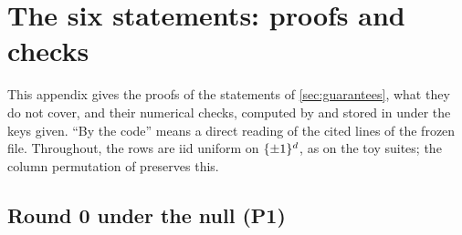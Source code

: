 \clearpage
\section{The six statements: proofs and checks}\label{app:proofs}

This appendix gives the proofs of the statements of \cref{sec:guarantees}, what they do not cover, and their numerical checks, computed by  and stored in  under the keys given. ``By the code'' means a direct reading of the cited lines of the frozen file. Throughout, the rows are iid uniform on $\{\pm1\}^d$, as on the toy suites; the column permutation of  preserves this.

\subsection{Round 0 under the null (P1)}\label{app:proof-null}

